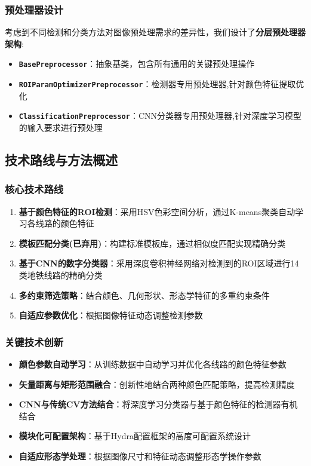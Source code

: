 \documentclass[12pt,a4paper]{article}
\begin{document}
\subsubsection{预处理器设计}

考虑到不同检测和分类方法对图像预处理需求的差异性，我们设计了\textbf{分层预处理器架构}:

\begin{itemize}
    \item \textbf{\texttt{BasePreprocessor}}：抽象基类，包含所有通用的关键预处理操作
    \item \textbf{\texttt{ROIParamOptimizerPreprocessor}}：检测器专用预处理器,针对颜色特征提取优化
    \item \textbf{\texttt{ClassificationPreprocessor}}：CNN分类器专用预处理器,针对深度学习模型的输入要求进行预处理
\end{itemize}

\subsection{技术路线与方法概述}

\subsubsection{核心技术路线}
\begin{enumerate}
    \item \textbf{基于颜色特征的ROI检测}：采用HSV色彩空间分析，通过K-means聚类自动学习各线路的颜色特征
    \item \textbf{模板匹配分类(已弃用)}：构建标准模板库，通过相似度匹配实现精确分类
    \item \textbf{基于CNN的数字分类器}：采用深度卷积神经网络对检测到的ROI区域进行14类地铁线路的精确分类
    \item \textbf{多约束筛选策略}：结合颜色、几何形状、形态学特征的多重约束条件
    \item \textbf{自适应参数优化}：根据图像特征动态调整检测参数
\end{enumerate}

\subsubsection{关键技术创新}
\begin{itemize}
    \item \textbf{颜色参数自动学习}：从训练数据中自动学习并优化各线路的颜色特征参数
    \item \textbf{矢量距离与矩形范围融合}：创新性地结合两种颜色匹配策略，提高检测精度
    \item \textbf{CNN与传统CV方法结合}：将深度学习分类器与基于颜色特征的检测器有机结合
    \item \textbf{模块化可配置架构}：基于Hydra配置框架的高度可配置系统设计
    \item \textbf{自适应形态学处理}：根据图像尺寸和特征动态调整形态学操作参数
\end{itemize}
\end{document}

